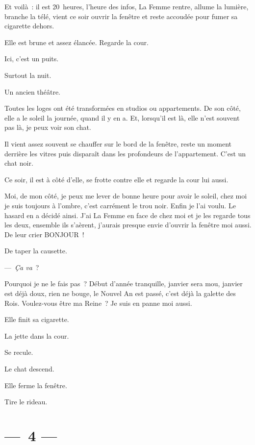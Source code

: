 \documentclass[twoside]{book} %
\begin{document}
\noindent Et voilà : il est 20 heures, l’heure des infos, La Femme rentre, allume la lumière, branche la télé, vient ce soir ouvrir la fenêtre et reste accoudée pour fumer sa cigarette dehors.\par
Elle est brune et assez élancée. Regarde la cour.\par
Ici, c’est un puits.\par
Surtout la nuit.\par
Un ancien théâtre.\par
Toutes les loges ont été transformées en studios ou appartements. De son côté, elle a le soleil la journée, quand il y en a. Et, lorsqu’il est là, elle n’est souvent pas là, je peux voir son chat.\par
Il vient assez souvent se chauffer sur le bord de la fenêtre, reste un moment derrière les vitres puis disparaît dans les profondeurs de l’appartement. C’est un chat noir.\par
Ce soir, il est à côté d’elle, se frotte contre elle et regarde la cour lui aussi.\par
Moi, de mon côté, je peux me lever de bonne heure pour avoir le soleil, chez moi je suis toujours à l’ombre, c’est carrément le trou noir. Enfin je l’ai voulu. Le hasard en a décidé ainsi. J’ai La Femme en face de chez moi et je les regarde tous les deux, ensemble ils s’aèrent, j’aurais presque envie d’ouvrir la fenêtre moi aussi. De leur crier BONJOUR !\par
De taper la causette.\par
— \emph{Ça va} ?\par
\bigbreak
\noindent Pourquoi je ne le fais pas ? Début d’année tranquille, janvier sera mou, janvier est déjà doux, rien ne bouge, le Nouvel An est passé, c’est déjà la galette des Rois. Voulez-vous être ma Reine ? Je suis en panne moi aussi.\par
Elle finit sa cigarette.\par
La jette dans la cour.\par
Se recule.\par
Le chat descend.\par
Elle ferme la fenêtre.\par
Tire le rideau.

\section[{— 4 —}]{— 4 —}
\renewcommand{\leftmark}{— 4 —}
\end{document}
